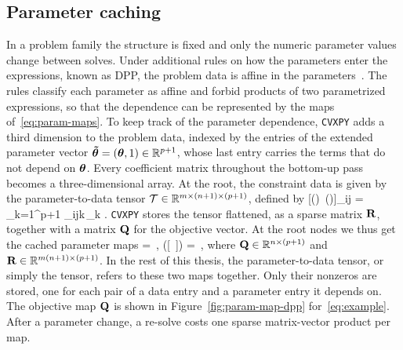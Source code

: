 \subsection{Parameter caching}\label{sec:ms-parameters}
In a problem family the structure is fixed and only the numeric parameter values change
between solves. Under additional rules on how the parameters enter the expressions, known as
\ac{DPP}, the problem data is affine in the parameters~\cite{agrawal2019dpp}.
The rules classify each parameter as affine and forbid products of two parametrized
expressions, so that the dependence can be represented by the maps of~\eqref{eq:param-maps}.
To keep track of the parameter dependence, \texttt{CVXPY} adds a third dimension to the
problem data, indexed by the entries of the extended parameter vector
$\bm{\tilde\theta} = (\bm{\theta}, 1) \in \mathbb{R}^{p+1}$, whose last entry carries the
terms that do not depend on $\bm{\theta}$. Every coefficient matrix throughout the bottom-up
pass becomes a three-dimensional array. At the root, the constraint data is given by the
parameter-to-data tensor $\mathcal{T} \in \mathbb{R}^{m \times (n+1) \times (p+1)}$, defined by
\BEQ\label{eq:param-tensor}
[(\gvec{\theta})\ (\gvec{\theta})]_{ij}
= \sum_{k=1}^{p+1} _{ijk}\,\tilde{\theta}_k .
\EEQ
\texttt{CVXPY} stores the tensor flattened, as a sparse matrix $\mathbf{R}$, together with a
matrix $\mathbf{Q}$ for the objective vector. At the root nodes we thus get the cached parameter
maps
\BEQ\label{eq:param-maps}
 = \,\gvec{\tilde\theta},
\qquad
\vect([\ ]) = \,\gvec{\tilde\theta},
\EEQ
where $\mathbf{Q} \in \mathbb{R}^{n \times (p+1)}$ and
$\mathbf{R} \in \mathbb{R}^{m(n+1) \times (p+1)}$. In the rest of this thesis, the
parameter-to-data tensor, or simply the tensor, refers to these two maps together. Only their
nonzeros are stored, one for each pair of a data entry and a parameter entry it depends on.
The objective map $\mathbf{Q}$ is shown in
Figure~\ref{fig:param-map-dpp} for~\eqref{eq:example}. After a parameter change, a
re-solve costs one sparse matrix-vector product per map.

